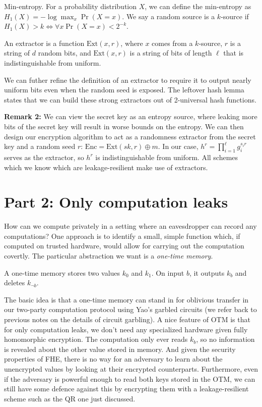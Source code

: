 \documentclass[10pt]{article}
\begin{document}
\begin{definition}
Min-entropy. For a probability distribution $X$, we can define the min-entropy as $H_1(X) = -\log \max_x \Pr(X = x)$. We say a random source is a $k$-source if $H_1(X) > k \iff \forall x \Pr(X = x) < 2^{-k}$.
\end{definition}

\begin{definition}
An extractor is a function $\mathrm{Ext}(x,r)$, where $x$ comes from a $k$-source, $r$ is a string of $d$ random bits, and $\mathrm{Ext}(x,r)$ is a string of bits of length $\ell$ that is indistinguishable from uniform.
\end{definition}

We can futher refine the definition of an extractor to require it to output nearly uniform bits even when the random seed is exposed. The leftover hash lemma states that we can build these strong extractors out of 2-universal hash functions.

\textbf{Remark 2:} We can view the secret key as an entropy source, where leaking more bits of the secret key will result in worse bounds on the entropy. We can then design our encryption algorithm to act as a randomness extractor from the secret key and a random seed $r$: $\mathrm{Enc} = \mathrm{Ext}(sk,r) \oplus m$. In our case, $h^r = \prod_{i=1}^\ell g_i^{s_i r}$ serves as the extractor, so $h^r$ is indistinguishable from uniform. All schemes which we know which are leakage-resilient make
use of extractors.

\section{Part 2: Only computation leaks}

How can we compute privately in a setting where an eavesdropper can record any computations? One approach is to identify a small, simple function which, if computed on trusted hardware, would allow for carrying out the computation covertly. The particular abstraction we want is a \emph{one-time memory}.

\begin{definition}
A one-time memory stores two values $k_0$ and $k_1$. On input $b$, it outputs $k_b$ and deletes $k_{\neg b}$.
\end{definition}

The basic idea is that a one-time memory can stand in for oblivious transfer in our two-party computation protocol using Yao's garbled circuits (we refer back to previous notes on the details of circuit garbling). A nice feature of OTM is that for only computation leaks, we don't need any specialized hardware given fully homomorphic encryption. The computation only ever reads $k_b$, so no information is revealed about the other value stored in memory. And given the security properties of
FHE, there is no way for an adversary to learn about the unencrypted values by looking at their encrypted counterparts. Furthermore, even if the adversary is powerful enough to read both keys stored in the OTM, we can still have some defence against this by encrypting them with a leakage-resilient scheme such as the QR one just discussed.
\end{document}
